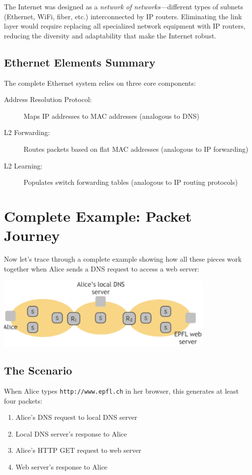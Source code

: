 \documentclass[../../compsys.tex]{subfiles}
\begin{document}
The Internet was designed as a \emph{network of networks}---different types of subnets (Ethernet, WiFi, fiber, etc.) interconnected by IP routers. Eliminating the link layer would require replacing all specialized network equipment with IP routers, reducing the diversity and adaptability that make the Internet robust.

\subsection{Ethernet Elements Summary}

The complete Ethernet system relies on three core components:

\begin{description}
    \item[Address Resolution Protocol:] Maps IP addresses to MAC addresses (analogous to DNS)
    \item[L2 Forwarding:] Routes packets based on flat MAC addresses (analogous to IP forwarding)
    \item[L2 Learning:] Populates switch forwarding tables (analogous to IP routing protocols)
\end{description}

\newpage
\section{Complete Example: Packet Journey}

Now let's trace through a complete example showing how all these pieces work together when Alice sends a DNS request to access a web server:

\begin{center}
    \includegraphics[width=0.8\textwidth]{images/topology-example.png}
\end{center}

\subsection{The Scenario}

When Alice types \texttt{http://www.epfl.ch} in her browser, this generates at least four packets:
\begin{enumerate}
    \item Alice's DNS request to local DNS server
    \item Local DNS server's response to Alice  
    \item Alice's HTTP GET request to web server
    \item Web server's response to Alice
\end{enumerate}
\end{document}
